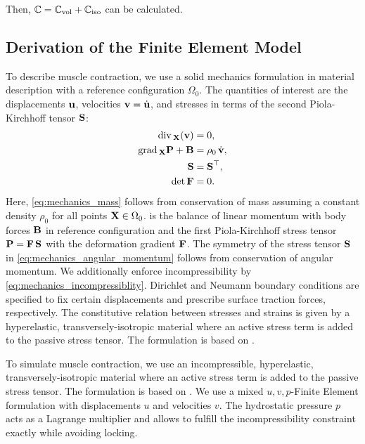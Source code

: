 Then, $\mathbb{C} = \mathbb{C}_\text{vol} + \mathbb{C}_\text{iso}$ can be calculated.
%
%


\subsection{Derivation of the Finite Element Model}




To describe muscle contraction, we use a solid mechanics formulation in material description with a reference configuration $\Omega_0$.
The quantities of interest are the displacements $\textbf{u}$, velocities $\textbf{v} = \dot{\textbf{u}}$, and stresses in terms of the second Piola-Kirchhoff tensor $\textbf{S}$:
\begin{align}
  \hbox{div} \,_{\textbf{X}}(\textbf{v}) &= 0, \label{eq:mechanics_mass} \\
  \hbox{grad} \,_{\textbf{X}} \textbf{P} + \textbf{B} &= \rho_0\,\dot{\textbf{v}}, \label{eq:mechanics_linear_momentum}\\
  \textbf{S} &= \textbf{S}^\top, \label{eq:mechanics_angular_momentum}\\
  \hbox{det} \, \textbf{F} &= 0.  \label{eq:mechanics_incompressiblity}
\end{align}
Here, \cref{eq:mechanics_mass} follows from conservation of mass assuming a constant density $\rho_0$ for all points $\textbf{X} \in \Omega_0$. 
 is the balance of linear momentum with body forces $\textbf{B}$ in reference configuration and the first Piola-Kirchhoff stress tensor ${\textbf{P} = \textbf{F}\,\textbf{S}}$ with the deformation gradient $\textbf{F}$.
The symmetry of the stress tensor $\textbf{S}$ in \cref{eq:mechanics_angular_momentum} follows from conservation of angular momentum. 
We additionally enforce incompressibility by \cref{eq:mechanics_incompressiblity}. Dirichlet and Neumann boundary conditions are specified to fix certain displacements and prescribe surface traction forces, respectively.
%
The constitutive relation between stresses and strains is given by a hyperelastic, transversely-isotropic material where an active stress term is added to the passive stress tensor. The formulation is based on \cite{Heidlauf2014a}.

To simulate muscle contraction, we use an incompressible, hyperelastic, transversely-isotropic material where an active stress term is added to the passive stress tensor. The formulation is based on \cite{Heidlauf2014a}.
We use a mixed $u,v,p$-Finite Element formulation with displacements $u$ and velocities $v$. The hydrostatic pressure $p$ acts as a Lagrange multiplier and allows to fulfill the incompressibility constraint exactly while avoiding locking.

